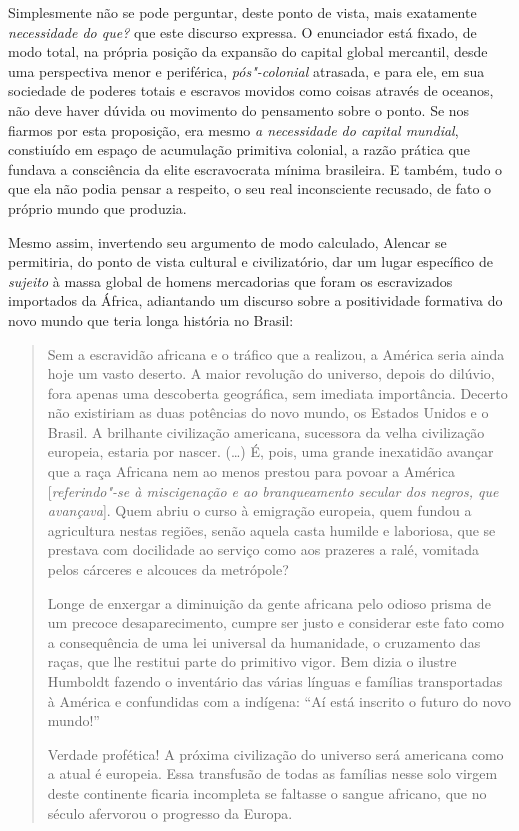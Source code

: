 Simplesmente não se pode perguntar, deste ponto de vista, mais
exatamente \emph{necessidade do que?} que este discurso expressa. O
enunciador está fixado, de modo total, na própria posição da expansão do
capital global mercantil, desde uma perspectiva menor e periférica,
\emph{pós"-colonial} atrasada, e para ele, em sua sociedade de poderes
totais e escravos movidos como coisas através de oceanos, não deve haver
dúvida ou movimento do pensamento sobre o ponto. Se nos fiarmos por esta
proposição, era mesmo \emph{a necessidade do capital mundial},
constiuído em espaço de acumulação primitiva colonial, a razão prática
que fundava a consciência da elite escravocrata mínima brasileira. E
também, tudo o que ela não podia pensar a respeito, o seu real
inconsciente recusado, de fato o próprio mundo que produzia.

Mesmo assim, invertendo seu argumento de modo calculado, Alencar se
permitiria, do ponto de vista cultural e civilizatório, dar um lugar
específico de \emph{sujeito} à massa global de homens mercadorias que
foram os escravizados importados da África, adiantando um discurso sobre
a positividade formativa do novo mundo que teria longa história no
Brasil:

\begin{quote}
Sem a escravidão africana e o tráfico que a realizou, a América seria
ainda hoje um vasto deserto. A maior revolução do universo, depois do
dilúvio, fora apenas uma descoberta geográfica, sem imediata
importância. Decerto não existiriam as duas potências do novo mundo, os
Estados Unidos e o Brasil. A brilhante civilização americana, sucessora
da velha civilização europeia, estaria por nascer. (\ldots{}) É, pois, uma
grande inexatidão avançar que a raça Africana nem ao menos prestou para
povoar a América {[}\emph{referindo"-se à miscigenação e ao branqueamento
secular dos negros, que avançava}{]}. Quem abriu o curso à emigração
europeia, quem fundou a agricultura nestas regiões, senão aquela casta
humilde e laboriosa, que se prestava com docilidade ao serviço como aos
prazeres a ralé, vomitada pelos cárceres e alcouces da metrópole?

Longe de enxergar a diminuição da gente africana pelo odioso prisma de
um precoce desaparecimento, cumpre ser justo e considerar este fato como
a consequência de uma lei universal da humanidade, o cruzamento das
raças, que lhe restitui parte do primitivo vigor. Bem dizia o ilustre
Humboldt fazendo o inventário das várias línguas e famílias
transportadas à América e confundidas com a indígena: ``Aí está inscrito
o futuro do novo mundo!''

Verdade profética! A próxima civilização do
universo será americana como a atual é europeia. Essa transfusão de
todas as famílias nesse solo virgem deste continente ficaria incompleta
se faltasse o sangue africano, que no século  afervorou o progresso
da Europa.
\end{quote}

